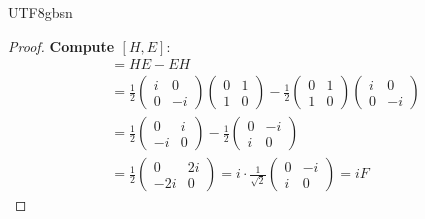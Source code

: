 \documentclass[a4paper,12pt]{extarticle}
\theoremstyle{definition}
\begin{document}
\begin{CJK}{UTF8}{gbsn}
\begin{proof}
\textbf{Compute $[H, E]$}:
\begin{align}
[H, E] &= HE - EH\\
&= \frac{1}{2}\begin{pmatrix} i & 0 \\ 0 & -i \end{pmatrix}\begin{pmatrix} 0 & 1 \\ 1 & 0 \end{pmatrix} - \frac{1}{2}\begin{pmatrix} 0 & 1 \\ 1 & 0 \end{pmatrix}\begin{pmatrix} i & 0 \\ 0 & -i \end{pmatrix}\\
&= \frac{1}{2}\begin{pmatrix} 0 & i \\ -i & 0 \end{pmatrix} - \frac{1}{2}\begin{pmatrix} 0 & -i \\ i & 0 \end{pmatrix}\\
&= \frac{1}{2}\begin{pmatrix} 0 & 2i \\ -2i & 0 \end{pmatrix} = i \cdot \frac{1}{\sqrt{2}}\begin{pmatrix} 0 & -i \\ i & 0 \end{pmatrix} = iF
\end{align}


\end{proof}
\end{CJK}
\end{document}
